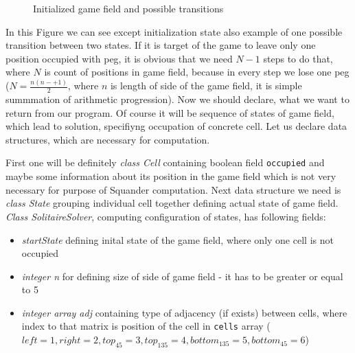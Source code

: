 \documentclass[11pt,twoside,a4paper]{book}
\begin{document}
\begin{figure}[ht]
\begin{center}
\begin{tikzpicture}[>=stealth]



\end{tikzpicture}

\end{center}
\caption{Initialized game field and possible transitions}
\label{fig:initGF}
\end{figure}

In this Figure we can see except initialization state also example of one
possible transition between two states. If it is target of the game to leave
only one position occupied with peg, it is obvious that we need $N - 1$ steps to
do that, where $N$ is count of positions in game field, because in every step we
lose one peg ($N = \frac{n(n-+1)}{2}$, where $n$ is length of side of the game
field, it is simple summmation of arithmetic progression). Now we should
declare, what we want to return from our program. Of course it will be sequence of states of game field, which lead to solution,
specifiyng occupation of concrete cell. Let us declare data structures, which
are necessary for computation.

First one will be definitely \textit{class Cell} containing boolean field
\verb|occupied| and maybe some information about its position in the game field
which is not very necessary for purpose of Squander computation. Next data
structure we need is \textit{class State} grouping individual cell together
defining actual state of game field. \textit{Class SolitaireSolver}, computing
configuration of states, has following fields:
\newpage
\begin{itemize}
  \item \textit{startState} defining inital state of the game field, where only
  one cell is not occupied
  \item \textit{integer n} for defining size of side of game field - it has to
  be greater or equal to 5
  \item \textit{integer array adj} containing type of adjacency (if exists)
  between cells, where index to that matrix is position of the cell in
  \verb|cells| array ($left=1, right=2, top_{45}=3, top_{135}=4, bottom_{135}=5,
  bottom_{45}=6$)
\end{itemize}
\end{document}
